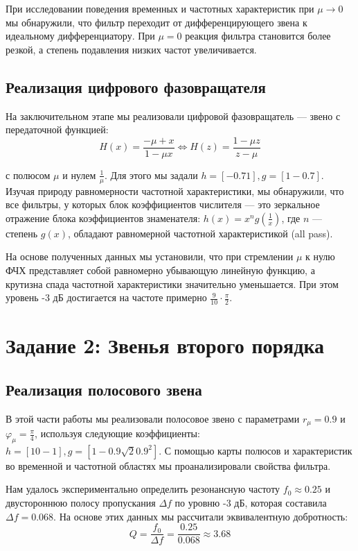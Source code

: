 При исследовании поведения временных и частотных характеристик при $\mu \rightarrow 0$ мы обнаружили, что фильтр переходит от дифференцирующего звена к идеальному дифференциатору. При $\mu = 0$ реакция фильтра становится более резкой, а степень подавления низких частот увеличивается.

\subsection{Реализация цифрового фазовращателя}
На заключительном этапе мы реализовали цифровой фазовращатель — звено с передаточной функцией:
\[H(x) = \frac{-\mu + x}{1 - \mu x} \Leftrightarrow H(z) = \frac{1 - \mu z}{z - \mu}\]

с полюсом $\mu$ и нулем $\frac{1}{\mu}$. Для этого мы задали $h = [-0.7 1], g = [1 -0.7]$. Изучая природу равномерности частотной характеристики, мы обнаружили, что все фильтры, у которых блок коэффициентов числителя — это зеркальное отражение блока коэффициентов знаменателя: $h(x) = x^n g(\frac{1}{x})$, где $n$ — степень $g(x)$, обладают равномерной частотной характеристикой (all pass).

На основе полученных данных мы установили, что при стремлении $\mu$ к нулю ФЧХ представляет собой равномерно убывающую линейную функцию, а крутизна спада частотной характеристики значительно уменьшается. При этом уровень -3 дБ достигается на частоте примерно $\frac{9}{10} \cdot \frac{\pi}{2}$.

\section{Задание 2: Звенья второго порядка}

\subsection{Реализация полосового звена}
В этой части работы мы реализовали полосовое звено с параметрами $r_\mu = 0.9$ и $\varphi_\mu = \frac{\pi}{4}$, используя следующие коэффициенты: $h = [1 0 -1], g = [1 -0.9\sqrt{2} 0.9^2]$. С помощью карты полюсов и характеристик во временной и частотной областях мы проанализировали свойства фильтра. 

Нам удалось экспериментально определить резонансную частоту $f_0 \approx 0.25$ и двустороннюю полосу пропускания $\Delta f$ по уровню -3 дБ, которая составила $\Delta f = 0.068$. На основе этих данных мы рассчитали эквивалентную добротность:
\[Q = \frac{f_0}{\Delta f} = \frac{0.25}{0.068} \approx 3.68\]

